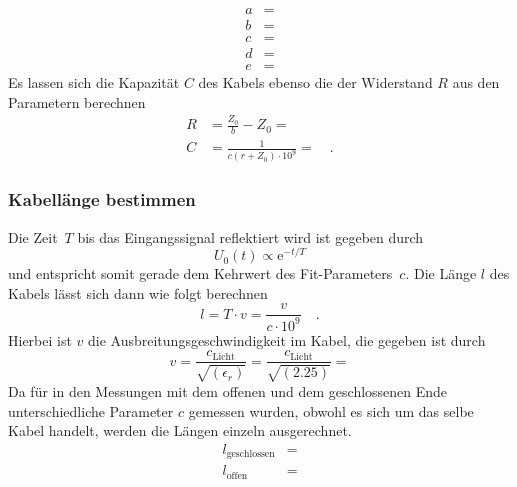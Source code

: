 \begin{align}
		a &=  \\
		b &=  \\
		c &=  \\
		d &=  \\
		e &=  
\end{align}
Es lassen sich die Kapazität $C$ des Kabels ebenso die der Widerstand $R$ aus den Parametern berechnen 
\begin{align}
	R &= \frac{Z_0}{b} - Z_0 =  \\
	C &= \frac{1}{ c (r + Z_0) \cdot 10^9} =  \quad.
\end{align}

\subsubsection{Kabellänge bestimmen}
Die Zeit~$T$ bis das Eingangssignal reflektiert wird ist gegeben durch 
\begin{equation}
	U_0(t) \propto \mathrm{e}^{-t/T} 
\end{equation}
und entspricht somit gerade dem Kehrwert des Fit-Parameters~$c$. Die Länge $l$ des Kabels lässt sich dann wie folgt berechnen
\begin{equation}
	l = T \cdot v = \frac{v}{c \cdot 10^{9}} \quad .
\end{equation}
Hierbei ist $v$ die Ausbreitungsgeschwindigkeit im Kabel, die gegeben ist durch
\begin{equation}
	v = \frac{c_{\textrm{Licht}}}{\sqrt{(\epsilon_r)}} = \frac{c_{\textrm{Licht}}}{\sqrt{(2.25)}} = 
\end{equation}
Da für in den Messungen mit dem offenen und dem geschlossenen Ende unterschiedliche Parameter $c$ gemessen wurden, obwohl es sich um das selbe Kabel handelt, werden die Längen einzeln ausgerechnet.
\begin{align}
	l_{\textrm{geschlossen}} &=  \\
	l_{\textrm{offen}} &= 
\end{align}

